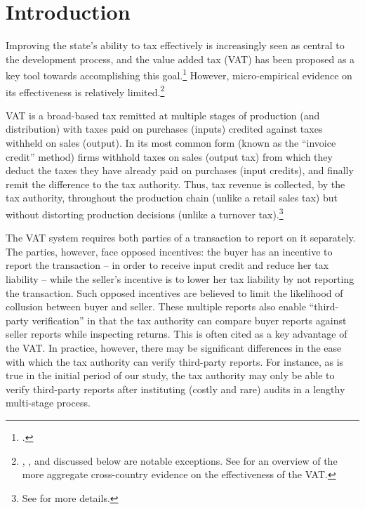 \section{Introduction} 
\label{sec:1-introduction} 
Improving the state's ability to tax effectively is increasingly seen as central to the development process, and the value added tax (VAT) has been proposed as a key tool towards accomplishing this goal.\footnote{\cite{besley2013taxation}.} However, micro-empirical evidence on its effectiveness is relatively limited.\footnote{\citet{almunia2018under}, \cite{naritomi2013consumers}, \cite{Carrilloetal:2017} and \cite{pomeranz2015no} discussed below are notable exceptions. See \cite{Ebrilletal:2001} for an overview of the more aggregate cross-country evidence on the effectiveness of the VAT.}

VAT is a broad-based tax remitted at multiple stages of production (and distribution) with taxes paid on purchases (inputs) credited against taxes withheld on sales (output). In its most common form (known as the ``invoice credit'' method) firms withhold taxes on sales (output tax) from which they deduct the taxes they have already paid on purchases (input credits), and finally remit the difference to the tax authority. Thus, tax revenue is collected, by the tax authority, throughout the production chain (unlike a retail sales tax) but without distorting production decisions (unlike a turnover tax).\footnote{See \cite{ITD2005} for more details.}

The VAT system requires both parties of a transaction to report on it separately. The parties, however, face opposed incentives: the buyer has an incentive to report the transaction -- in order to receive input credit and reduce her tax liability -- while the seller's incentive is to lower her tax liability by not reporting the
transaction. Such opposed incentives are believed to limit the likelihood of collusion between buyer and seller. These multiple reports also enable ``third-party verification'' in that the tax authority can compare buyer reports against seller reports while inspecting returns. This is often cited as a key advantage of the VAT. In
practice, however, there may be significant differences in the ease with which the tax authority can verify third-party reports. For instance, as is true in the initial period of our study, the tax authority may only be able to verify third-party reports after instituting (costly and rare) audits in a lengthy multi-stage process.


